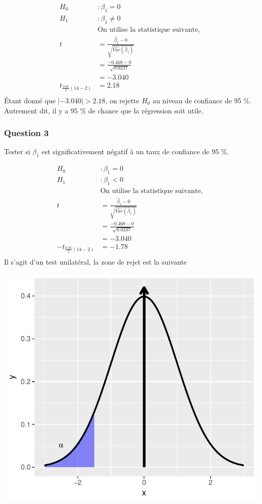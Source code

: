 \documentclass[11pt,french]{report}
\begin{document}
\begin{align*}
H_0 &: \beta_1 = 0\\
H_1 &: \beta_1 \neq 0 \\
&\text{On utilise la statistique suivante, } \\
t &= \frac{\hat{\beta}_1 - 0 }{\sqrt{\widehat{Var}(\hat{\beta}_1)}} \\
&= \frac{-0.468 - 0}{\sqrt{0.0237}}\\
&= -3.040\\
t_{\frac{0.05}{2}(14-2)} &= 2.18\\
\end{align*}
Étant donné que $|-3.040| > 2.18$, on rejette $H_0$ au niveau de confiance de 95 \%. Autrement dit, il y a 95 \% de chance que la régression soit utile.

\subsubsection*{Question 3}
Tester si $\beta_1$ est significativement négatif à un taux de confiance de 95 \%.

\begin{align*}
H_0 &: \beta_1 = 0\\
H_1 &: \beta_1 < 0 \\
&\text{On utilise la statistique suivante, } \\
t &= \frac{\hat{\beta}_1 - 0 }{\sqrt{\widehat{Var}(\hat{\beta}_1)}} \\
&= \frac{-0.468 - 0}{\sqrt{0.0237}} \\
&= -3.040 \\
-t_{\frac{0.05}{2}(14-2)} &= -1.78 \\
\end{align*}
Il s'agit d'un test unilatéral, la zone de rejet est la suivante

\includegraphics{notes_de_cours-017}
\end{document}
